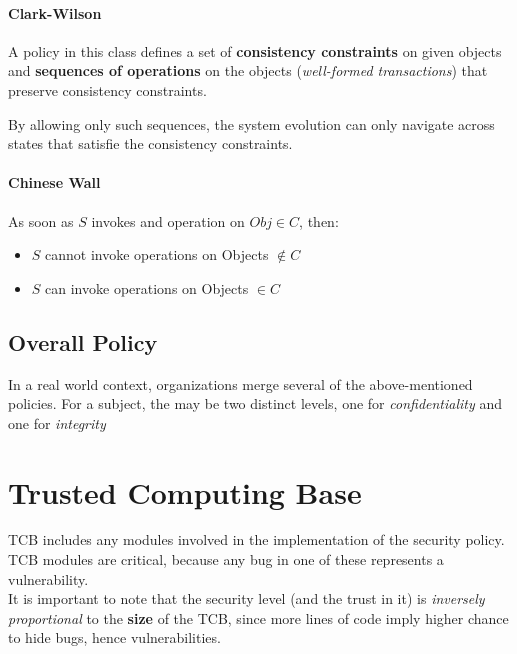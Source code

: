 \paragraph{Clark-Wilson}
A policy in this class defines a set of \textbf{consistency constraints} on given objects and \textbf{sequences of operations} on the objects (\textit{well-formed transactions}) that preserve consistency constraints.

By allowing only such sequences, the system evolution can only navigate across states that satisfie the consistency constraints.

\paragraph{Chinese Wall}
As soon as $S$ invokes and operation on $Obj \in C$,
then:
\begin{itemize}
    \item $S$ cannot invoke operations on Objects $ \notin C$
    \item $S$ can invoke operations on Objects $ \in C$
\end{itemize}

\subsection{Overall Policy}
In a real world context, organizations merge several of the above-mentioned policies.
For a subject, the may be two distinct levels, one for \textit{confidentiality} and one for \textit{integrity}

\section{Trusted Computing Base}
TCB includes any modules involved in the implementation of the security policy.
TCB modules are critical, because any bug in one of these represents a vulnerability.\\
It is important to note that the security level (and the trust in it) is \textit{inversely proportional} to the \textbf{size} of the TCB,
since more lines of code imply higher chance to hide bugs,
hence vulnerabilities.

